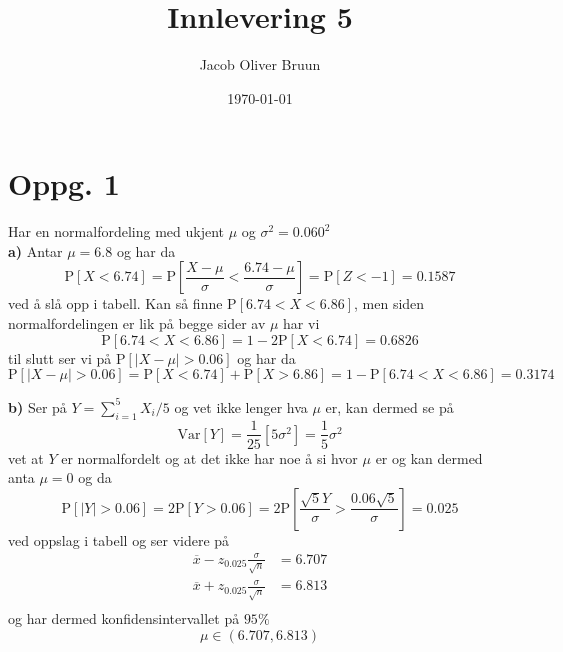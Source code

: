 \documentclass{report}
\title{Innlevering 5}
\author{Jacob Oliver Bruun}
\date{\today}
\newcommand{\nbrack}[1]{\left( #1 \right)}
\newcommand{\bbrack}[1]{\left[ #1 \right]}
\newcommand{\Var}[1]{\text{Var} \bbrack{ #1 }}
\newcommand{\Prob}[1]{\text{P} \bbrack{ #1 }}
\begin{document}
\section*{Oppg. 1}
Har en normalfordeling med ukjent $\mu$ og $\sigma^{2} = 0.060^{2}$ \\

\textbf{a)}
Antar $\mu = 6.8$ og har da
\begin{equation}
  \label{eq:1}
  \Prob{ X < 6.74 } = \Prob{ \frac{X-\mu}{\sigma} < \frac{6.74 - \mu}{\sigma}} = \Prob{ Z < -1 } = 0.1587
\end{equation}
ved å slå opp i tabell. Kan så finne $\Prob{6.74 < X < 6.86}$, men siden normalfordelingen er lik på begge sider av $\mu$ har vi
\begin{equation}
  \label{eq:2}
  \Prob{6.74 < X < 6.86} = 1 - 2\Prob{ X < 6.74 } = 0.6826
\end{equation}
til slutt ser vi på $\Prob{ |X - \mu| > 0.06 }$ og har da
\begin{equation}
  \label{eq:3}
  \Prob{ |X - \mu| > 0.06 } = \Prob{X < 6.74} + \Prob{X > 6.86} = 1 - \Prob{6.74 < X < 6.86} = 0.3174
\end{equation}

\textbf{b)}
Ser på $Y = \sum_{i=1}^{5} X_{i}/5$ og vet ikke lenger hva $\mu$ er, kan dermed se på
\begin{equation}
  \label{eq:5}
  \Var{Y} = \frac{1}{25} \bbrack{ 5\sigma^{2} } = \frac{1}{5} \sigma^{2}
\end{equation}
vet at $Y$ er normalfordelt og at det ikke har noe å si hvor $\mu$ er og kan dermed anta $\mu = 0$ og da
\begin{equation}
  \label{eq:20}
  \Prob{|Y| > 0.06} = 2\Prob{Y > 0.06} = 2\Prob{\frac{\sqrt{5} Y}{\sigma} > \frac{0.06\sqrt{5}}{\sigma}} = 0.025
\end{equation}
ved oppslag i tabell og ser videre på
\begin{equation}
  \label{eq:18}
  \begin{split}
    \overline{x} - z_{0.025}\frac{\sigma}{\sqrt{n}} &= 6.707 \\
    \overline{x} + z_{0.025}\frac{\sigma}{\sqrt{n}} &= 6.813 \\
  \end{split}
\end{equation}
og har dermed konfidensintervallet på $95\%$
\begin{equation}
  \label{eq:19}
  \mu \in \nbrack{ 6.707, 6.813 }
\end{equation}
\end{document}
